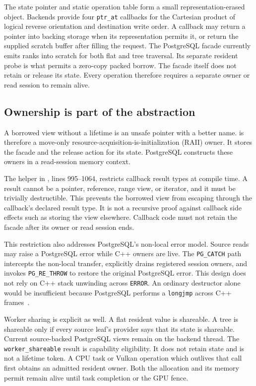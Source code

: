 The state pointer and static operation table form a small
representation-erased object.  Backends provide four \texttt{ptr\_at}
callbacks for the Cartesian product of logical reverse orientation and
destination write order.  A callback may return a pointer into backing
storage when its representation permits it, or return the supplied scratch
buffer after filling the request.  The PostgreSQL facade currently emits
ranks into scratch for both flat and tree traversal.  Its separate resident
probe is what permits a zero-copy packed borrow.  The facade itself does not
retain or release its state.  Every operation therefore requires a separate
owner or read session to remain alive.

\subsection{Ownership is part of the abstraction}

A borrowed view without a lifetime is an unsafe pointer with a better name.
 is therefore a move-only
resource-acquisition-is-initialization (RAII) owner.  It stores the facade and
the release action for its state.  PostgreSQL constructs these owners in a
read-session memory context.

The helper  in
, lines 995--1064, restricts callback result types at
compile time.  A result cannot be a pointer, reference, range view, or iterator,
and it must be trivially destructible.  This prevents the borrowed view from
escaping through the callback's declared result type.  It is not a recursive
proof against callback side effects such as storing the view elsewhere.
Callback code must not retain the facade after its owner or read session ends.

This restriction also addresses PostgreSQL's non-local error model.
Source reads may raise a PostgreSQL error while C++ owners are live.  The
\texttt{PG\_CATCH} path intercepts the non-local transfer, explicitly drains
registered session owners, and invokes \texttt{PG\_RE\_THROW} to restore the
original PostgreSQL error.  This design does not rely on C++ stack unwinding
across \texttt{ERROR}.  An ordinary destructor alone would be insufficient
because PostgreSQL performs a \texttt{longjmp} across C++
frames~\cite{postgresql17_cpp_extensibility}.

Worker sharing is explicit as well.  A flat resident value is shareable.
A tree is shareable only if every source leaf's provider says that its state
is shareable.  Current source-backed PostgreSQL views remain on the backend
thread.  The \texttt{worker\_shareable} result is capability eligibility.  It
does not retain state and is not a lifetime token.  A CPU task or Vulkan
operation which outlives that call first obtains an admitted resident owner.
Both the allocation and its memory permit remain alive until task completion
or the GPU fence.

